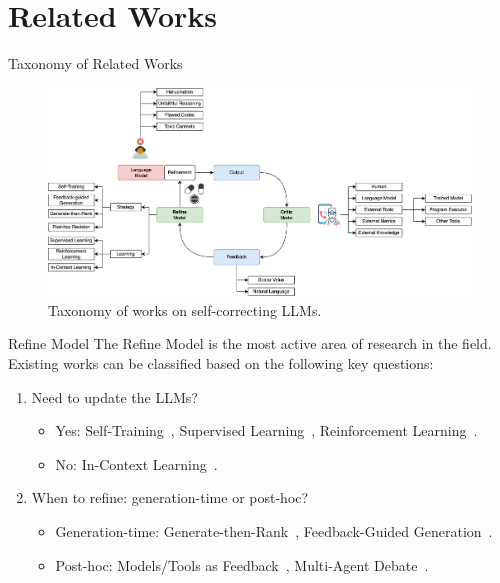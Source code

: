 \section{Related Works}

\begin{frame}{Taxonomy of Related Works}
    \begin{figure}
        \centering
        \includegraphics[width=1\textwidth]{img/taxonomy}
        \captionsetup{font=small,labelformat=empty}
        \caption{Taxonomy of works on self-correcting LLMs.}\label{fig:taxonomy}
    \end{figure}
\end{frame}

\begin{frame}{Refine Model}
    The Refine Model is the most active area of research in the field. Existing works can be classified based on the following key questions:
    \begin{enumerate}
        \item Need to update the LLMs?
              \begin{itemize}
                  \item Yes: Self-Training~\cite{huang2022large}, Supervised Learning~\cite{bai2022training}, Reinforcement Learning~\cite{dubois2024alpacafarm}.
                  \item No: In-Context Learning~\cite{dong2022survey}.
              \end{itemize}

        \item When to refine: generation-time or post-hoc?
              \begin{itemize}
                  \item Generation-time: Generate-then-Rank~\cite{cobbe2021training}, Feedback-Guided Generation~\cite{yao2023tree}.
                  \item Post-hoc: Models/Tools as Feedback~\cite{zhang2023selfedit}, Multi-Agent Debate~\cite{du2023improving}.
              \end{itemize}
    \end{enumerate}
\end{frame}


